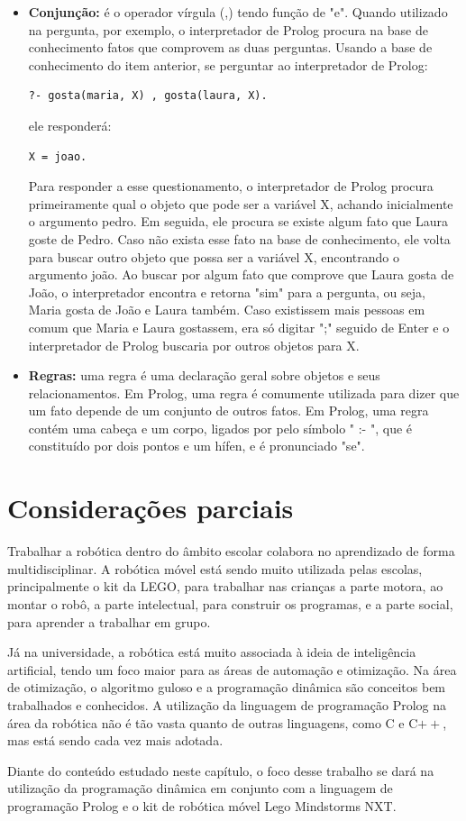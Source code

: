 \begin{itemize}
\item \textbf{Conjunção:} é o operador vírgula (,) tendo função de "e". Quando utilizado na pergunta, por exemplo, o interpretador de Prolog procura na base de conhecimento fatos que comprovem as duas perguntas. Usando a base de conhecimento do item anterior, se perguntar ao interpretador de Prolog: 
\lstset{language=Prolog}
\begin{lstlisting}
?- gosta(maria, X) , gosta(laura, X).
\end{lstlisting}
ele responderá:
\lstset{language=Prolog}
\begin{lstlisting}
X = joao.
\end{lstlisting}
Para responder a esse questionamento, o interpretador de Prolog procura primeiramente qual o objeto que pode ser a variável X, achando inicialmente o argumento pedro. Em seguida, ele procura se existe algum fato que Laura goste de Pedro. Caso não exista esse fato na base de conhecimento, ele volta para buscar outro objeto que possa ser a variável X, encontrando o argumento joão. Ao buscar por algum fato que comprove que Laura gosta de João, o interpretador encontra e retorna "sim" para a pergunta, ou seja, Maria gosta de João e Laura também. Caso existissem mais pessoas em comum que Maria e Laura gostassem, era só digitar ";" seguido de Enter e o interpretador de Prolog buscaria por outros objetos para X.
\item \textbf{Regras:} uma regra é uma declaração geral sobre objetos e seus relacionamentos. Em Prolog, uma regra é comumente utilizada para dizer que um fato depende de um conjunto de outros fatos. Em Prolog, uma regra contém uma cabeça e um corpo, ligados por pelo símbolo " :- ", que é constituído por dois pontos e um hífen, e é pronunciado "se". 
\end{itemize}

\section{Considerações parciais}
Trabalhar a robótica dentro do âmbito escolar colabora no aprendizado de forma multidisciplinar. A robótica móvel está sendo muito utilizada pelas escolas, principalmente o kit da LEGO, para trabalhar nas crianças a parte motora, ao montar o robô, a parte intelectual, para construir os programas, e a parte social, para aprender a trabalhar em grupo.

Já na universidade, a robótica está muito associada à ideia de inteligência artificial, tendo um foco maior para as áreas de automação e otimização. Na área de otimização, o algoritmo guloso e a programação dinâmica são conceitos bem trabalhados e conhecidos. A utilização da linguagem de programação Prolog na área da robótica não é tão vasta quanto de outras linguagens, como C e C$++$, mas está sendo cada vez mais adotada. 

Diante do conteúdo estudado neste capítulo, o foco desse trabalho se dará na utilização da programação dinâmica em conjunto com a linguagem de programação Prolog e o kit de robótica móvel Lego Mindstorms NXT. 